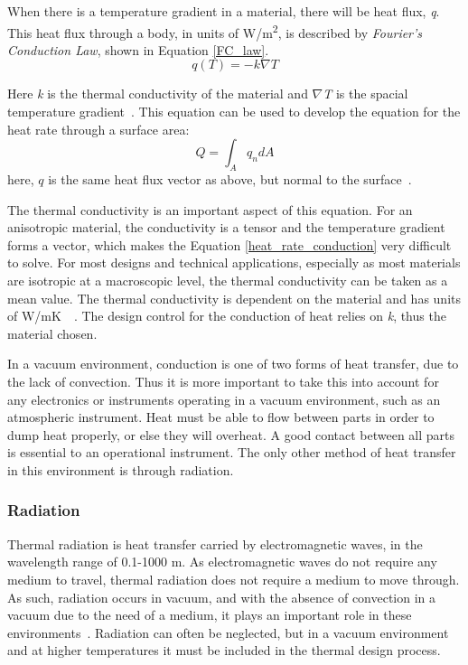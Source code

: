 When there is a temperature gradient in a material, there will be heat flux, \textit{q}. This heat flux through a body, in units of W/m\textsuperscript{2}, is described by \textit{Fourier’s Conduction Law}, shown in Equation \ref{FC_law}.
\begin{equation} \label{FC_law}
    q(T) = -k\nabla T
\end{equation}

Here \textit{k} is the thermal conductivity of the material and $\nabla$\textit{T} is the spacial temperature gradient~\citep{heat_transfer_textbook}. This equation can be used to develop the equation for the heat rate through a surface area:
\begin{equation} \label{heat_rate_conduction}
    Q = \int_{A}q_ndA
\end{equation}
here, $q$ is the same heat flux vector as above, but normal to the surface~\citep{Heat_Transfer_Basics}.

The thermal conductivity is an important aspect of this equation. For an anisotropic material, the conductivity is a tensor and the temperature gradient forms a vector, which makes the Equation \ref{heat_rate_conduction} very difficult to solve. For most designs and technical applications, especially as most materials are isotropic at a macroscopic level, the thermal conductivity can be taken as a mean value. The thermal conductivity is dependent on the material and has units of W/mK~\citep{heat_transfer_textbook}~\citep{FEA_SW}. The design control for the conduction of heat relies on \textit{k}, thus the material chosen. 

In a vacuum environment, conduction is one of two forms of heat transfer, due to the lack of convection. Thus it is more important to take this into account for any electronics or instruments operating in a vacuum environment, such as an atmospheric instrument. Heat must be able to flow between parts in order to dump heat properly, or else they will overheat. A good contact between all parts is essential to an operational instrument. The only other method of heat transfer in this environment is through radiation. 

\subsubsection{Radiation}
Thermal radiation is heat transfer carried by electromagnetic waves, in the wavelength range of 0.1-1000 \textmu m. As electromagnetic waves do not require any medium to travel, thermal radiation does not require a medium to move through. As such, radiation occurs in vacuum, and with the absence of convection in a vacuum due to the need of a medium, it plays an important role in these environments~\citep{Heat_Transfer_Basics}. Radiation can often be neglected, but in a vacuum environment and at higher temperatures it must be included in the thermal design process.


